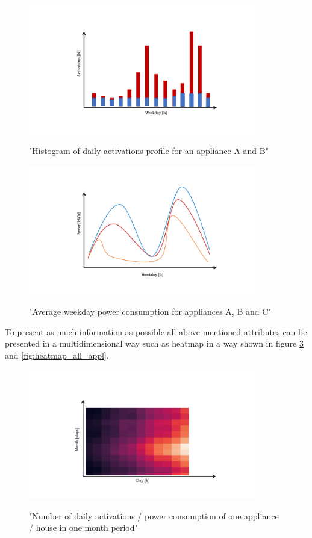 \begin{figure}[H]
	\centering
	\caption{"Histogram of daily activations profile for an appliance A and B"}
	\includegraphics[width=0.9\textwidth]{Figures/profile_sketches/Slide8.png}
	\label{fig:daily_act_m_profile}
\end{figure}
\begin{figure}[H]
	\centering
	\caption{"Average weekday power consumption for appliances A, B and C"}
	\includegraphics[width=0.9\textwidth]{Figures/profile_sketches/Slide2.png}
	\label{fig:daily_power_m_profile}
\end{figure}

To present as much information as possible all above-mentioned attributes 
can be presented in a multidimensional way such as heatmap in a way shown in figure \ref{fig:heatmap_2dtime} and \ref{fig:heatmap_all_appl}.

\begin{figure}[H]
	\centering
	\caption{"Number of daily activations / power consumption of one appliance / house in one month period"}
	\includegraphics[width=0.9\textwidth]{Figures/profile_sketches/Slide10.png}
	\label{fig:heatmap_2dtime}
\end{figure}

